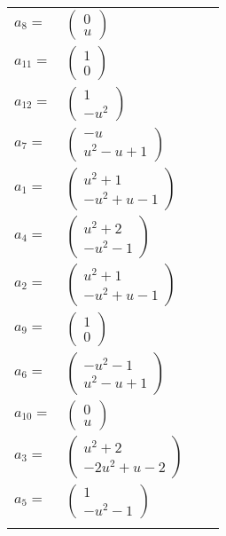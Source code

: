 \documentclass[1p]{elsarticle_modified}
\theoremstyle{definition}
\begin{document}
\begin{tabular}{m{7pt} m{180pt} m{7pt} m{180pt} }
\flushright $a_{8}=$&$\begin{pmatrix}0\\u\end{pmatrix}$ \\
\flushright $a_{11}=$&$\begin{pmatrix}1\\0\end{pmatrix}$ \\
\flushright $a_{12}=$&$\begin{pmatrix}1\\- u^2\end{pmatrix}$ \\
\flushright $a_{7}=$&$\begin{pmatrix}- u\\u^2- u+1\end{pmatrix}$ \\
\flushright $a_{1}=$&$\begin{pmatrix}u^2+1\\- u^2+u-1\end{pmatrix}$ \\
\flushright $a_{4}=$&$\begin{pmatrix}u^2+2\\- u^2-1\end{pmatrix}$ \\
\flushright $a_{2}=$&$\begin{pmatrix}u^2+1\\- u^2+u-1\end{pmatrix}$ \\
\flushright $a_{9}=$&$\begin{pmatrix}1\\0\end{pmatrix}$ \\
\flushright $a_{6}=$&$\begin{pmatrix}- u^2-1\\u^2- u+1\end{pmatrix}$ \\
\flushright $a_{10}=$&$\begin{pmatrix}0\\u\end{pmatrix}$ \\
\flushright $a_{3}=$&$\begin{pmatrix}u^2+2\\-2 u^2+u-2\end{pmatrix}$ \\
\flushright $a_{5}=$&$\begin{pmatrix}1\\- u^2-1\end{pmatrix}$\\&\end{tabular}
\end{document}
